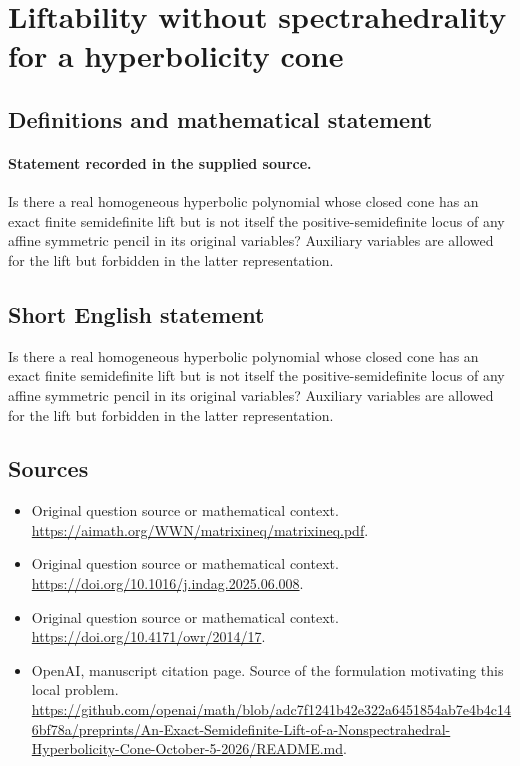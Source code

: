 \documentclass[11pt]{article}
\begin{document}
\section*{Liftability without spectrahedrality for a hyperbolicity cone}\label{30007123}
\subsection{Definitions and mathematical statement}
\paragraph{Statement recorded in the supplied source.}
Is there a real homogeneous hyperbolic polynomial whose closed cone has an exact finite semidefinite lift but is not itself the positive-semidefinite locus of any affine symmetric pencil in its original variables? Auxiliary variables are allowed for the lift but forbidden in the latter representation.
\subsection{Short English statement}
Is there a real homogeneous hyperbolic polynomial whose closed cone has an exact finite semidefinite lift but is not itself the positive-semidefinite locus of any affine symmetric pencil in its original variables? Auxiliary variables are allowed for the lift but forbidden in the latter representation.
\subsection{Sources}
\begin{itemize}
\item[S1] Original question source or mathematical context.
\url{https://aimath.org/WWN/matrixineq/matrixineq.pdf}.
\item[S2] Original question source or mathematical context.
\url{https://doi.org/10.1016/j.indag.2025.06.008}.
\item[S3] Original question source or mathematical context.
\url{https://doi.org/10.4171/owr/2014/17}.
\item[S4] OpenAI, manuscript citation page. Source of the formulation motivating this local problem.
\url{https://github.com/openai/math/blob/adc7f1241b42e322a6451854ab7e4b4c146bf78a/preprints/An-Exact-Semidefinite-Lift-of-a-Nonspectrahedral-Hyperbolicity-Cone-October-5-2026/README.md}.
\end{itemize}
\end{document}
